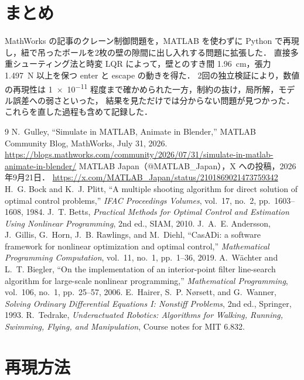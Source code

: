 \documentclass[a4paper,10pt]{ltjsarticle}
\begin{document}
\section{まとめ}

MathWorks の記事のクレーン制御問題を，MATLAB を使わずに Python で再現し，紐で吊ったボールを2枚の壁の隙間に出し入れする問題に拡張した．
直接多重シューティング法と時変 LQR によって，壁とのすき間 \SI{1.96}{cm}，張力 \SI{1.497}{N} 以上を保つ enter と escape の動きを得た．
2回の独立検証により，数値の再現性は \num{1e-11} 程度まで確かめられた一方，制約の抜け，局所解，モデル誤差への弱さといった，
結果を見ただけでは分からない問題が見つかった．これらを直した過程も含めて記録した．

\begin{thebibliography}{9}
   N.~Gulley, ``Simulate in MATLAB, Animate in Blender,'' MATLAB Community Blog, MathWorks, July 31, 2026.
    \url{https://blogs.mathworks.com/community/2026/07/31/simulate-in-matlab-animate-in-blender/}
   MATLAB Japan（@MATLAB\_Japan），X への投稿，2026年9月21日．
    \url{https://x.com/MATLAB_Japan/status/2101869021473759342}
   H.~G. Bock and K.~J. Plitt, ``A multiple shooting algorithm for direct solution of optimal control problems,''
    \emph{IFAC Proceedings Volumes}, vol.~17, no.~2, pp.~1603--1608, 1984.
   J.~T. Betts, \emph{Practical Methods for Optimal Control and Estimation Using Nonlinear Programming}, 2nd ed., SIAM, 2010.
   J.~A.~E. Andersson, J.~Gillis, G.~Horn, J.~B. Rawlings, and M.~Diehl,
    ``CasADi: a software framework for nonlinear optimization and optimal control,''
    \emph{Mathematical Programming Computation}, vol.~11, no.~1, pp.~1--36, 2019.
   A.~W\"achter and L.~T. Biegler, ``On the implementation of an interior-point filter line-search algorithm for large-scale nonlinear programming,''
    \emph{Mathematical Programming}, vol.~106, no.~1, pp.~25--57, 2006.
   E.~Hairer, S.~P. N{\o}rsett, and G.~Wanner, \emph{Solving Ordinary Differential Equations I: Nonstiff Problems}, 2nd ed., Springer, 1993.
   R.~Tedrake, \emph{Underactuated Robotics: Algorithms for Walking, Running, Swimming, Flying, and Manipulation}, Course notes for MIT 6.832.
\end{thebibliography}

\appendix
\section{再現方法}
\end{document}
